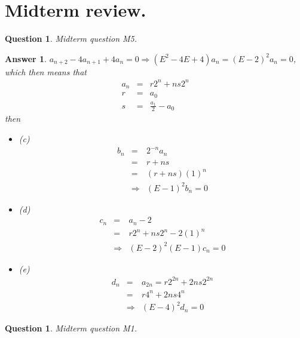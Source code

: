 \documentclass[11pt,english]{article}
\newtheorem{question}[theorem]{Question}
\newtheorem{answer}[theorem]{Answer}
\begin{document}
\section{Midterm review.}

\begin{question}

Midterm question M5.

\end{question}

\begin{answer}

$a_{n+2}-4a_{n+1}+4a_{n}=0\Rightarrow\left(E^{2}-4E+4\right)a_{n}=\left(E-2\right)^{2}a_{n}=0$,
which then means that \begin{eqnarray*}
a_{n} & = & r2^{n}+ns2^{n}\\
r & = & a_{0}\\
s & = & \frac{a_{1}}{2}-a_{0}\end{eqnarray*}
then
\begin{itemize}
\item (c) \begin{eqnarray*}
b_{n} & = & 2^{-n}a_{n}\\
 & = & r+ns\\
 & = & \left(r+ns\right)(1)^{n}\\
 & \Rightarrow & \left(E-1\right)^{2}b_{n}=0\end{eqnarray*}

\item (d)\begin{eqnarray*}
c_{n} & = & a_{n}-2\\
 & = & r2^{n}+ns2^{n}-2(1)^{n}\\
 & \Rightarrow & \left(E-2\right)^{2}(E-1)c_{n}=0\end{eqnarray*}

\item (e)\begin{eqnarray*}
d_{n} & = & a_{2n}=r2^{2n}+2ns2^{2n}\\
 & = & r4^{n}+2ns4^{n}\\
 & \Rightarrow & \left(E-4\right)^{2}d_{n}=0\end{eqnarray*}

\end{itemize}
\end{answer}\newpage{}

\begin{question}

Midterm question M1.

\end{question}
\end{document}
